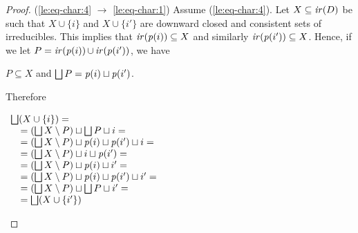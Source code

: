 \begin{proof}
  
  \bigskip

  (\ref{le:eq-char:4} $\to$ \ref{le:eq-char:1}) Assume
  (\ref{le:eq-char:4}).  Let $X \subseteq \mathop{\mathit{ir}({D})}$
  be such that $X \cup \{ i\}$ and $X \cup \{ i'\}$ are downward
  closed and consistent sets of irreducibles. This implies that
  $\mathop{\mathit{ir}({\mathit{p}({i})})} \subseteq X$ and similarly
  $\mathop{\mathit{ir}({\mathit{p}({i'})})} \subseteq X$.  Hence, if we let
  $P = \mathop{\mathit{ir}({\mathit{p}({i})})} \cup \mathop{\mathit{ir}({\mathit{p}({i'})})}$, we have
  \begin{center}
    $P  \subseteq X$ \quad and \quad $\bigsqcup P = \mathit{p}({i}) \sqcup \mathit{p}({i'})$.
  \end{center}
  Therefore
  \begin{center}
    $
    \begin{array}{ll}
      \bigsqcup (X \cup \{ i \}) =\\
      \quad = (\bigsqcup X \setminus P) \sqcup \bigsqcup P \sqcup i =\\
      \quad = (\bigsqcup X \setminus P) \sqcup \mathit{p}({i}) \sqcup \mathit{p}({i'}) \sqcup i =\\
      \quad = (\bigsqcup X \setminus P) \sqcup i \sqcup \mathit{p}({i'}) =\\
      \quad = (\bigsqcup X \setminus P) \sqcup \mathit{p}({i}) \sqcup i' =\\
      \quad = (\bigsqcup X \setminus P) \sqcup \mathit{p}({i}) \sqcup \mathit{p}({i'})  \sqcup i' =\\
      \quad = (\bigsqcup X \setminus P) \sqcup \bigsqcup P \sqcup i' =\\
      \quad = \bigsqcup (X \cup \{ i' \})
    \end{array}
    $
  \end{center}
\end{proof}




